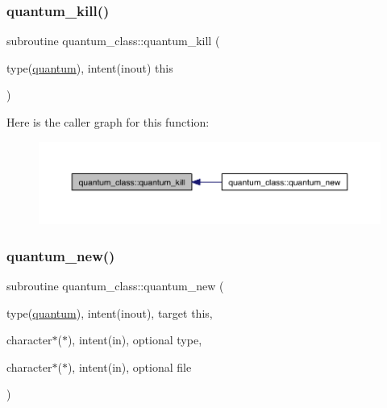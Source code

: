 \mbox{\label{namespacequantum__class_a1c73725245a04e63092d2152579c4bd9}} 
\subsubsection{\texorpdfstring{quantum\+\_\+kill()}{quantum\_kill()}}
{\footnotesize\ttfamily subroutine quantum\+\_\+class\+::quantum\+\_\+kill (\begin{DoxyParamCaption}\item[{type(\hyperlink{structquantum__class_1_1quantum}{quantum}), intent(inout)}]{this }\end{DoxyParamCaption})\hspace{0.3cm}{\ttfamily [private]}}

Here is the caller graph for this function\+:\nopagebreak
\begin{figure}[H]
\begin{center}
\leavevmode
\includegraphics[width=350pt]{namespacequantum__class_a1c73725245a04e63092d2152579c4bd9_icgraph}
\end{center}
\end{figure}
\mbox{\label{namespacequantum__class_a3170f42702712b16bcc152509752f18e}} 
\subsubsection{\texorpdfstring{quantum\+\_\+new()}{quantum\_new()}}
{\footnotesize\ttfamily subroutine quantum\+\_\+class\+::quantum\+\_\+new (\begin{DoxyParamCaption}\item[{type(\hyperlink{structquantum__class_1_1quantum}{quantum}), intent(inout), target}]{this,  }\item[{character$\ast$($\ast$), intent(in), optional}]{type,  }\item[{character$\ast$($\ast$), intent(in), optional}]{file }\end{DoxyParamCaption})\hspace{0.3cm}{\ttfamily [private]}}

